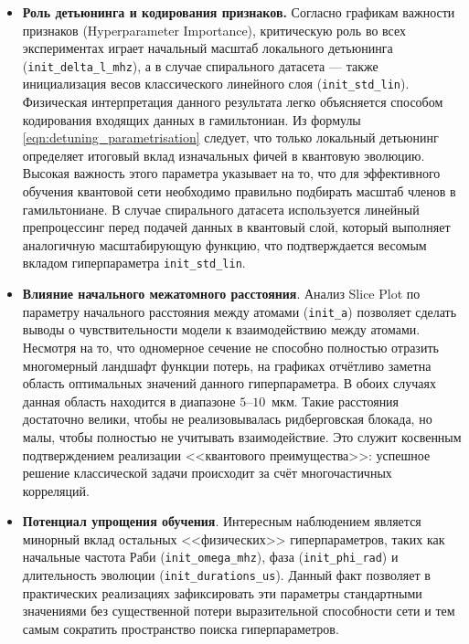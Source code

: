 \begin{itemize}
    \item \textbf{Роль детьюнинга и кодирования признаков.} Согласно графикам важности признаков (Hyperparameter Importance), критическую роль во всех экспериментах играет начальный масштаб локального детьюнинга (\texttt{init\_delta\_l\_mhz}), а в случае спирального датасета — также инициализация весов классического линейного слоя (\texttt{init\_std\_lin}). Физическая интерпретация данного результата легко объясняется способом кодирования входящих данных в гамильтониан. Из формулы \ref{eqn:detuning_parametrisation} следует, что только локальный детьюнинг определяет итоговый вклад изначальных фичей в квантовую эволюцию. Высокая важность этого параметра указывает на то, что для эффективного обучения квантовой сети необходимо правильно подбирать масштаб членов в гамильтониане. В случае спирального датасета используется линейный препроцессинг перед подачей данных в квантовый слой, который выполняет аналогичную масштабирующую функцию, что подтверждается весомым вкладом гиперпараметра \texttt{init\_std\_lin}.
    \item \textbf{Влияние начального межатомного расстояния}. Анализ Slice Plot по параметру начального расстояния между атомами (\texttt{init\_a}) позволяет сделать выводы о чувствительности модели к взаимодействию между атомами. Несмотря на то, что одномерное сечение не способно полностью отразить многомерный ландшафт функции потерь, на графиках отчётливо заметна область оптимальных значений данного гиперпараметра. В обоих случаях данная область находится в диапазоне $5$--$10$~мкм. Такие расстояния достаточно велики, чтобы не реализовывалась ридберговская блокада, но малы, чтобы полностью не учитывать взаимодействие. Это служит косвенным подтверждением реализации <<квантового преимущества>>: успешное решение классической задачи происходит за счёт многочастичных корреляций.
    \item \textbf{Потенциал упрощения обучения}. Интересным наблюдением является минорный вклад остальных <<физических>> гиперпараметров, таких как начальные частота Раби (\texttt{init\_omega\_mhz}), фаза (\texttt{init\_phi\_rad}) и длительность эволюции (\texttt{init\_durations\_us}). Данный факт позволяет в практических реализациях зафиксировать эти параметры стандартными значениями без существенной потери выразительной способности сети и тем самым сократить пространство поиска гиперпараметров.
\end{itemize}


